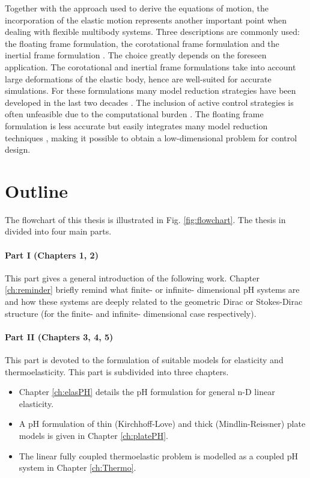 \indent Together with the approach used to derive the equations of motion, the incorporation of the elastic motion represents another important point when dealing with flexible multibody systems. Three descriptions are commonly used: the floating frame formulation, the corotational frame formulation and the inertial frame formulation \cite{ellenbroek2018}. The choice greatly depends on the foreseen application.  The corotational and inertial frame formulations take into account large deformations of the elastic body, hence are well-suited for accurate simulations. For these formulations many model reduction strategies have been developed in the last two decades \cite{rong2019}. The inclusion of active control strategies is often unfeasible due to the computational burden \cite{wasfy2003survey}. The floating frame formulation is less accurate but easily integrates many model reduction techniques \cite{nowakowski2012}, making it possible to obtain a low-dimensional problem for control design. \\


\section{Outline}

The flowchart of this thesis is illustrated in Fig. \ref{fig:flowchart}. The thesis in divided into four main parts.

\paragraph{Part I (Chapters 1, 2)}
This part gives a general introduction of the following work. Chapter \ref{ch:reminder} briefly remind what  finite- or infinite- dimensional pH systems are and how these systems are deeply related to the geometric Dirac  or Stokes-Dirac structure (for the finite- and infinite- dimensional case respectively).

\paragraph{Part II (Chapters 3, 4, 5)}
This part is devoted to the formulation of suitable models for elasticity and thermoelasticity. This part is subdivided into three chapters.
\begin{itemize}
\item Chapter \ref{ch:elasPH} details the pH formulation for general n-D linear elasticity.
\item A pH formulation of thin (Kirchhoff-Love) and thick (Mindlin-Reissner) plate models is given in Chapter \ref{ch:platePH}.
\item The linear fully coupled thermoelastic problem is modelled as a coupled pH system in Chapter \ref{ch:Thermo}. 
\end{itemize}


